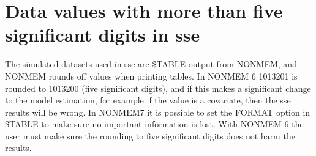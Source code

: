 \section{Data values with more than five significant digits in sse}
The simulated datasets used in sse are \$TABLE output from NONMEM, and NONMEM rounds off values when printing tables. In NONMEM 6 1013201 is rounded to 1013200 (five significant digits), and if this makes a significant change to the model estimation, for example if the value is a covariate, then the sse results will be wrong. In NONMEM7 it is possible to set the FORMAT option in \$TABLE to make sure no important information is lost. With NONMEM 6 the user must make sure the rounding to five significant digits does not harm the results.




